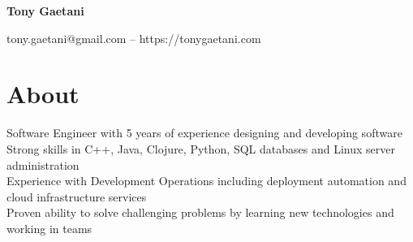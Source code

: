 \documentclass{article}
\begin{document}
\begin{center}
{\LARGE\bf Tony Gaetani}\\
\end{center}
\begin{center}
tony.gaetani@gmail.com -- https://tonygaetani.com
\end{center}

\section*{About}
Software Engineer with 5 years of experience designing and developing software\\
Strong skills in C++, Java, Clojure, Python, SQL databases and Linux server administration\\
Experience with Development Operations including deployment automation and cloud infrastructure services\\
Proven ability to solve challenging problems by learning new technologies and working in teams
\end{document}
